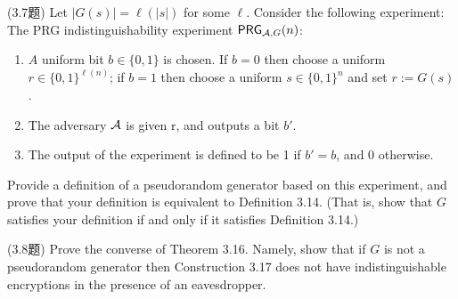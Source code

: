 \begin{questions}
        \begin{solution}
        \end{solution}

    \question (3.7题) Let $|G(s)|=\ell(|s|)$ for some $\ell$. Consider the following experiment:\\The PRG indistinguishability experiment $\mathsf{PRG}_{\mathcal{A},G}(n)$:

        \begin{enumerate}
            \item $A$ uniform bit $b\in\{0,1\}$ is chosen. If $b=0$ then choose a uniform $r\in\{0,1\}^{\ell(n)}$; if $b=1$ then choose a uniform $s\in\{0,1\}^n$ and set $r:=G(s)$.
            \item The adversary $\mathcal{A}$ is given r, and outputs a bit $b'$.
            \item The output of the experiment is defined to be 1 if $b'=b$, and 0 otherwise.
        \end{enumerate}

        Provide a definition of a pseudorandom generator based on this experiment, and prove that your definition is equivalent to Definition 3.14. (That is, show that $G$ satisfies your definition if and only if it satisfies Definition 3.14.)

        \begin{solution}
        \end{solution}

    \question (3.8题) Prove the converse of Theorem 3.16. Namely, show that if $G$ is not a pseudorandom generator then Construction 3.17 does not have indistinguishable encryptions in the presence of an eavesdropper.

        \begin{solution}
        \end{solution}

\end{questions}



